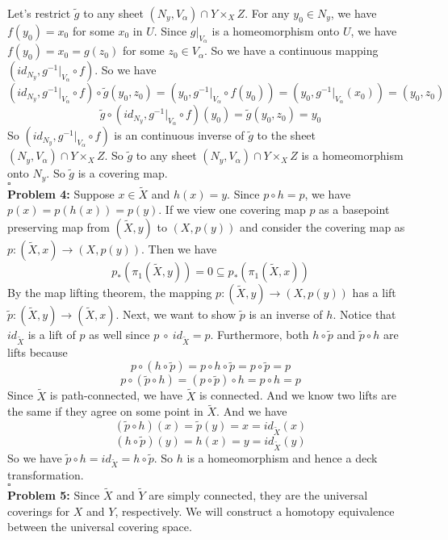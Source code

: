 \documentclass[12pt]{amsart}
\begin{document}
Let's restrict $\tilde{g}$ to any sheet $(N_y,V_\alpha)\cap Y\times_X Z$. For any $y_0\in N_y$, we have $f(y_0)=x_0$ for some $x_0$ in $U$. Since $g|_{V_\alpha}$ is a homeomorphism onto $U$, we have $f(y_0)=x_0=g(z_0)$ for some $z_0\in V_\alpha$. So we have a continuous mapping $(id_{N_y},g^{-1}|_{V_\alpha}\circ f)$. So we have 
\[(id_{N_y},g^{-1}|_{V_\alpha}\circ f)\circ \tilde{g}(y_0,z_0)=(y_0,g^{-1}|_{V_\alpha}\circ f(y_0))=(y_0,g^{-1}|_{V_\alpha}(x_0))=(y_0,z_0)\]
\[\tilde{g}\circ (id_{N_y},g^{-1}|_{V_\alpha}\circ f)(y_0)=\tilde{g}(y_0,z_0)=y_0\]
So $(id_{N_y},g^{-1}|_{V_\alpha}\circ f)$ is an continuous inverse of $\tilde{g}$ to the sheet $(N_y,V_\alpha)\cap Y\times_X Z$. So $\tilde{g}$ to any sheet $(N_y,V_\alpha)\cap Y\times_X Z$ is a homeomorphism onto $N_y$. So $\tilde{g}$ is a covering map.
\\\phantom{qed}\hfill$\square$\\
\textbf{Problem 4:} Suppose $x\in \tilde{X}$ and $h(x)=y$. Since $p\circ h=p$, we have $p(x)=p(h(x))=p(y)$. If we view one covering map $p$ as a basepoint preserving map from $(\tilde{X},y)$ to $(X,p(y))$ and consider the covering map as $p:(\tilde{X},x)\to (X,p(y))$. Then we have 
\[p_\ast(\pi_1(\tilde{X},y))=0\subseteq p_\ast(\pi_1(\tilde{X},x))\]
By the map lifting theorem, the mapping $p:(\tilde{X},y)\to (X,p(y))$ has a lift $\tilde{p}: (\tilde{X},y)\to (\tilde{X},x)$.
Next, we want to show $\tilde{p}$ is an inverse of $h$. Notice that $id_{\tilde{X}}$ is a lift of $p$ as well since $p\ \circ \ id_{\tilde{X}}=p$. Furthermore, both $h\circ \tilde{p}$ and $\tilde{p}\circ h$ are lifts because 
\[p\circ (h\circ \tilde{p})=p\circ h\circ \tilde{p}=p\circ \tilde{p}=p\]
\[p\circ (\tilde{p}\circ h)=(p\circ \tilde{p})\circ h=p\circ h=p\]
Since $\tilde{X}$ is path-connected, we have $\tilde{X}$ is connected. And we know two lifts are the same if they agree on some point in $\tilde{X}$. And we have 
\[(\tilde{p}\circ h)(x)=\tilde{p}(y)=x=id_{\tilde{X}}(x)\]
\[(h\circ \tilde{p})(y)=h(x)=y=id_{\tilde{X}}(y)\]
So we have $\tilde{p}\circ h=id_{\tilde{X}}=h\circ \tilde{p}$. So $h$ is a homeomorphism and hence a deck transformation.
\\\phantom{qed}\hfill$\square$\\
\textbf{Problem 5:} Since $\tilde{X}$ and $\tilde{Y}$ are simply connected, they are the universal coverings for $X$ and $Y$, respectively. We will construct a homotopy equivalence between the universal covering space.\\
\end{document}
